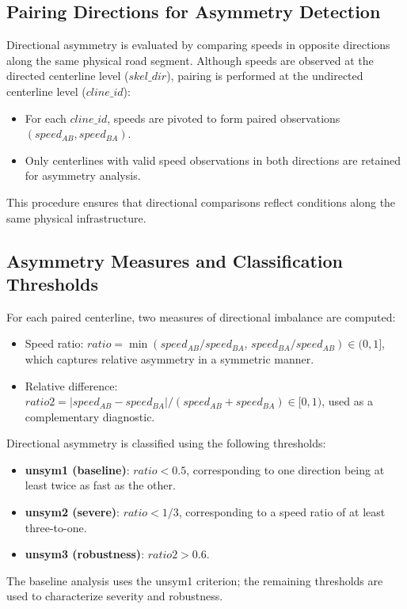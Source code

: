 \documentclass[12pt]{article}
\begin{document}
	\subsection{Pairing Directions for Asymmetry Detection}
	
	Directional asymmetry is evaluated by comparing speeds in opposite directions along the same physical road segment. Although speeds are observed at the directed centerline level ($skel\_dir$), pairing is performed at the undirected centerline level ($cline\_id$):
	\begin{itemize}
		\item For each $cline\_id$, speeds are pivoted to form paired observations $(speed_{AB}, speed_{BA})$.
		\item Only centerlines with valid speed observations in both directions are retained for asymmetry analysis.
	\end{itemize}
	This procedure ensures that directional comparisons reflect conditions along the same physical infrastructure.
	
	\subsection{Asymmetry Measures and Classification Thresholds}
	
	For each paired centerline, two measures of directional imbalance are computed:
	\begin{itemize}
		\item Speed ratio: $ratio = \min(speed_{AB}/speed_{BA},\, speed_{BA}/speed_{AB}) \in (0,1]$, which captures relative asymmetry in a symmetric manner.
		\item Relative difference: $ratio2 = |speed_{AB} - speed_{BA}| / (speed_{AB} + speed_{BA}) \in [0,1)$, used as a complementary diagnostic.
	\end{itemize}
	
	Directional asymmetry is classified using the following thresholds:
	\begin{itemize}
		\item \textbf{unsym1 (baseline)}: $ratio < 0.5$, corresponding to one direction being at least twice as fast as the other.
		\item \textbf{unsym2 (severe)}: $ratio < 1/3$, corresponding to a speed ratio of at least three-to-one.
		\item \textbf{unsym3 (robustness)}: $ratio2 > 0.6$.
	\end{itemize}
	The baseline analysis uses the unsym1 criterion; the remaining thresholds are used to characterize severity and robustness.
	
\end{document}
